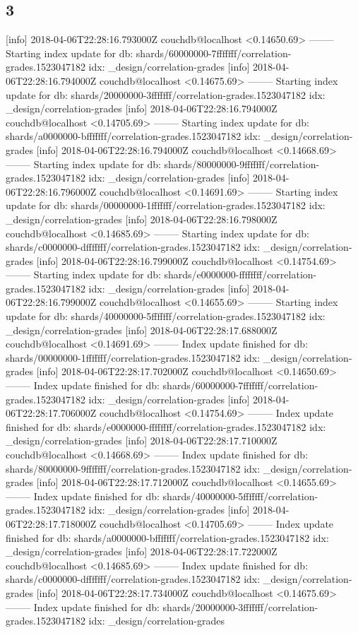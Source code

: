 \subsection{3}
[info] 2018-04-06T22:28:16.793000Z couchdb@localhost <0.14650.69> -------- Starting index update for db: shards/60000000-7fffffff/correlation-grades.1523047182 idx: _design/correlation-grades
[info] 2018-04-06T22:28:16.794000Z couchdb@localhost <0.14675.69> -------- Starting index update for db: shards/20000000-3fffffff/correlation-grades.1523047182 idx: _design/correlation-grades
[info] 2018-04-06T22:28:16.794000Z couchdb@localhost <0.14705.69> -------- Starting index update for db: shards/a0000000-bfffffff/correlation-grades.1523047182 idx: _design/correlation-grades
[info] 2018-04-06T22:28:16.794000Z couchdb@localhost <0.14668.69> -------- Starting index update for db: shards/80000000-9fffffff/correlation-grades.1523047182 idx: _design/correlation-grades
[info] 2018-04-06T22:28:16.796000Z couchdb@localhost <0.14691.69> -------- Starting index update for db: shards/00000000-1fffffff/correlation-grades.1523047182 idx: _design/correlation-grades
[info] 2018-04-06T22:28:16.798000Z couchdb@localhost <0.14685.69> -------- Starting index update for db: shards/c0000000-dfffffff/correlation-grades.1523047182 idx: _design/correlation-grades
[info] 2018-04-06T22:28:16.799000Z couchdb@localhost <0.14754.69> -------- Starting index update for db: shards/e0000000-ffffffff/correlation-grades.1523047182 idx: _design/correlation-grades
[info] 2018-04-06T22:28:16.799000Z couchdb@localhost <0.14655.69> -------- Starting index update for db: shards/40000000-5fffffff/correlation-grades.1523047182 idx: _design/correlation-grades
[info] 2018-04-06T22:28:17.688000Z couchdb@localhost <0.14691.69> -------- Index update finished for db: shards/00000000-1fffffff/correlation-grades.1523047182 idx: _design/correlation-grades
[info] 2018-04-06T22:28:17.702000Z couchdb@localhost <0.14650.69> -------- Index update finished for db: shards/60000000-7fffffff/correlation-grades.1523047182 idx: _design/correlation-grades
[info] 2018-04-06T22:28:17.706000Z couchdb@localhost <0.14754.69> -------- Index update finished for db: shards/e0000000-ffffffff/correlation-grades.1523047182 idx: _design/correlation-grades
[info] 2018-04-06T22:28:17.710000Z couchdb@localhost <0.14668.69> -------- Index update finished for db: shards/80000000-9fffffff/correlation-grades.1523047182 idx: _design/correlation-grades
[info] 2018-04-06T22:28:17.712000Z couchdb@localhost <0.14655.69> -------- Index update finished for db: shards/40000000-5fffffff/correlation-grades.1523047182 idx: _design/correlation-grades
[info] 2018-04-06T22:28:17.718000Z couchdb@localhost <0.14705.69> -------- Index update finished for db: shards/a0000000-bfffffff/correlation-grades.1523047182 idx: _design/correlation-grades
[info] 2018-04-06T22:28:17.722000Z couchdb@localhost <0.14685.69> -------- Index update finished for db: shards/c0000000-dfffffff/correlation-grades.1523047182 idx: _design/correlation-grades
[info] 2018-04-06T22:28:17.734000Z couchdb@localhost <0.14675.69> -------- Index update finished for db: shards/20000000-3fffffff/correlation-grades.1523047182 idx: _design/correlation-grades


